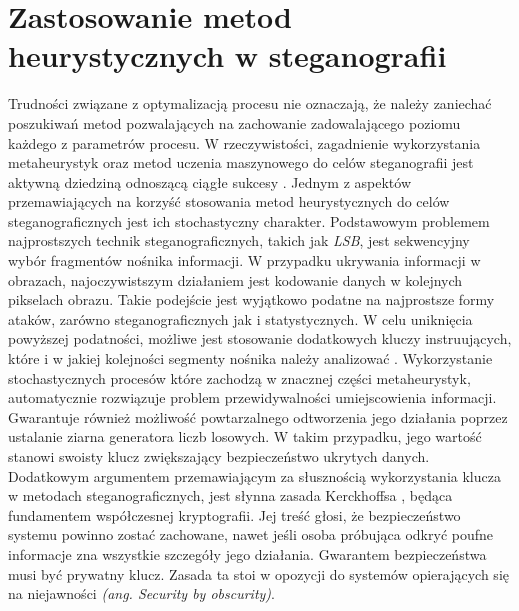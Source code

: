 {    %
    \section{Zastosowanie metod heurystycznych w steganografii}
    {
        Trudności związane z optymalizacją procesu nie oznaczają, że należy zaniechać poszukiwań metod pozwalających na
        zachowanie zadowalającego poziomu każdego z parametrów procesu. W rzeczywistości, zagadnienie wykorzystania
        metaheurystyk oraz metod uczenia maszynowego do celów steganografii jest aktywną dziedziną odnoszącą ciągłe
        sukcesy \cite{ElEmam2013NewSA, Zhao2021AntCO, Khan2018AntCO, Saleema2016ANS, Li2007ASM}.
        Jednym z aspektów przemawiających na korzyść stosowania metod heurystycznych do celów steganograficznych jest
        ich stochastyczny charakter. Podstawowym problemem najprostszych technik steganograficznych, takich jak
        \textit{LSB}, jest sekwencyjny wybór fragmentów nośnika informacji. W przypadku ukrywania informacji w
        obrazach, najoczywistszym działaniem jest kodowanie danych w kolejnych pikselach obrazu. Takie podejście jest
        wyjątkowo podatne na najprostsze formy ataków, zarówno steganograficznych jak i statystycznych. W celu
        uniknięcia powyższej podatności, możliwe jest stosowanie dodatkowych kluczy instruujących, które i w jakiej
        kolejności segmenty nośnika należy analizować \cite{AlHusainy2019ASI}. Wykorzystanie stochastycznych procesów
        które zachodzą w znacznej części metaheurystyk, automatycznie rozwiązuje problem przewidywalności umiejscowienia
        informacji. Gwarantuje również możliwość powtarzalnego odtworzenia jego działania poprzez ustalanie ziarna
        generatora liczb losowych. W takim przypadku, jego wartość stanowi swoisty klucz zwiększający bezpieczeństwo
        ukrytych danych.
        Dodatkowym argumentem przemawiającym za słusznością wykorzystania klucza w metodach steganograficznych, jest
        słynna zasada Kerckhoffsa \cite{Guillot2013AugusteKE}, będąca fundamentem współczesnej kryptografii. Jej treść
        głosi, że bezpieczeństwo systemu powinno zostać zachowane, nawet jeśli osoba próbująca odkryć poufne informacje
        zna wszystkie szczegóły jego działania. Gwarantem bezpieczeństwa musi być prywatny klucz. Zasada ta stoi w
        opozycji do systemów opierających się na niejawności \textit{(ang. Security by obscurity)}.

}}

